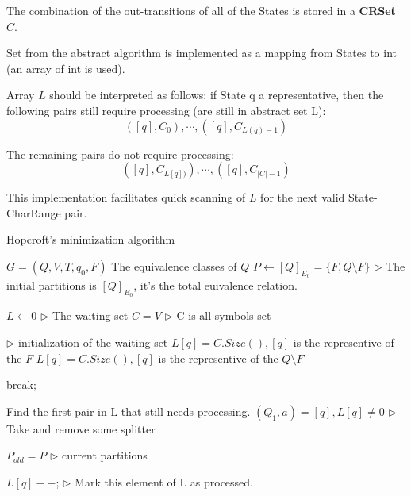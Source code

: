 The combination of the out-transitions of all of the States is stored in a
\textbf{CRSet $C$}. 

Set  from the abstract algorithm is implemented as a mapping from States to int (an array of int is used). 

Array $L$ should be interpreted as follows: if State q a representative,
then the following pairs still require processing (are still in abstract set L):
$$([q], C_0),\cdots, ([q], C_{L(q)-1}) $$

The remaining pairs do not require processing:
$$([q], C_{L[q])}),\cdots, ([q], C_{|C|-1}) $$

This implementation facilitates quick scanning of $L$ for the next valid State-CharRange pair.

\begin{algorithm}[htbp]
	\caption{Hopcroft's minimization algorithm}  \label{alg:hopcroft}
	\begin{algorithmic}[1] %
		\Require $G =(Q,V,T,q_0,F)$  
		\Ensure The equivalence classes of $Q$  
		\State $P \gets [Q]_{E_0}=\{F,Q\setminus F \}$  \qquad\qquad $\triangleright$ The initial partitions is $[Q]_{E_0}$, it's the total euivalence relation.
		
		\State $L \gets 0$  \qquad\qquad $\triangleright$ The waiting set
		\State $C = V$  \qquad\qquad $\triangleright$ C is all symbols set
		
		  \qquad\qquad 			$\triangleright$ initialization of the waiting set
			\State $L[q]=C.Size(), [q]$ is the representive of the $F$
		\Else
			\State $L[q]=C.Size(), [q]$ is the representive of the $Q\setminus F$
		\EndIf
		
				\State break;
			\EndIf
			
			\State Find the first pair in L that still needs processing. $(Q_1,a) = [q], L[q]\ne 0$ \qquad\qquad $\triangleright$ Take and remove some splitter
			
			\State $P_{old} = P$  \qquad\qquad $\triangleright$ current partitions
			
			\State $L[q]--$; \qquad\qquad $\triangleright$ Mark this element of L as processed.
	

\end{algorithmic}
\end{algorithm}
